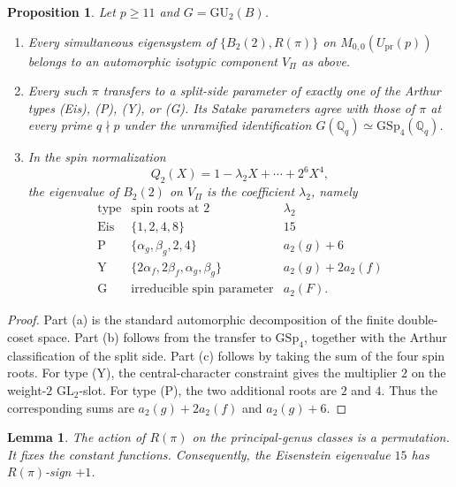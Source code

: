 \documentclass[10pt,a4paper]{amsart}
\newtheorem{proposition}[theorem]{Proposition}
\newtheorem{lemma}[theorem]{Lemma}
\newcommand{\Q}{\mathbb{Q}}
\newcommand{\GU}{\mathrm{GU}}
\newcommand{\GSp}{\mathrm{GSp}}
\newcommand{\Upr}{U_{\mathrm{pr}}}
\providecommand{\Upr}{U_{\mathrm{pr}}}
\begin{document}
	\begin{proposition}	\label{prop:arthur}
		Let $p\ge11$ and $G=\GU_2(B)$.
		\begin{enumerate}[label=\textup{(\alph*)},leftmargin=2.3em]
			\item Every simultaneous eigensystem of $\{B_2(2),R(\pi)\}$ on
			$M_{0,0}(\Upr(p))$ belongs to an automorphic isotypic component $V_\Pi$
			as above.
			\item Every such $\pi$ transfers to a split-side parameter of exactly one
			of the Arthur types \textup{(Eis)}, \textup{(P)}, \textup{(Y)}, or
			\textup{(G)}. Its Satake parameters agree with those of $\pi$ at every
			prime $q\nmid p$ under the unramified identification
			$G(\Q_q)\simeq\GSp_4(\Q_q)$.
			\item In the spin normalization
			\[
			Q_2(X)=1-\lambda_2X+\cdots+2^6X^4,
			\]
			the eigenvalue of $B_2(2)$ on $V_\Pi$ is the coefficient $\lambda_2$,
			namely
			\[
			\begin{array}{c|c|c}
				\text{type} & \text{spin roots at }2 & \lambda_2\\
				\hline
				\mathrm{Eis} & \{1,2,4,8\} & 15\\
				\mathrm{P} & \{\alpha_g,\beta_g,2,4\} & a_2(g)+6\\
				\mathrm{Y} & \{2\alpha_f,2\beta_f,\alpha_g,\beta_g\}
				& a_2(g)+2a_2(f)\\
				\mathrm{G} & \text{irreducible spin parameter} & a_2(F).
			\end{array}
			\]
		\end{enumerate}
	\end{proposition}
	
	\begin{proof}
		Part \textup{(a)} is the standard automorphic decomposition of the
		finite double-coset space. Part \textup{(b)} follows from the transfer to
		$\GSp_4$, together with the Arthur classification of the split side.
		Part \textup{(c)} follows by taking the sum of the four spin roots. For
		type \textup{(Y)}, the central-character constraint gives the multiplier
		$2$ on the weight-$2$ $\mathrm{GL}_2$-slot. For type \textup{(P)}, the two
		additional roots are $2$ and $4$. Thus the corresponding sums are
		$a_2(g)+2a_2(f)$ and $a_2(g)+6$.
	\end{proof}
	
	\begin{lemma}
		\label{lem:eis}
		The action of $R(\pi)$ on the principal-genus classes is a permutation.
		It fixes the constant functions. Consequently, the Eisenstein eigenvalue
		$15$ has $R(\pi)$-sign $+1$.
	\end{lemma}
	
\end{document}

